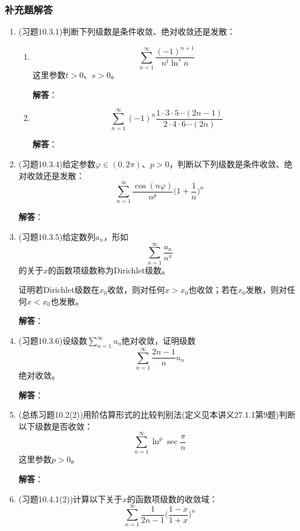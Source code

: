 \documentclass[a4paper,UTF8,fontset=windows,AutoFakeBold]{ctexart}
\newcommand*{\suminf}[1][n=1]{\sum_{#1}^\infty}
\theoremstyle{ex}
\newcommand{\sol}[1]{{\vspace{5pt}\kaishu\noindent\textbf{解答}：\vspace{-3pt}
\begin{compactitem}
    \item[] #1
\end{compactitem}
}}
\begin{document}
\subsubsection{补充题解答}
\begin{enumerate}
    \item (习题10.3.1)判断下列级数是条件收敛、绝对收敛还是发散：
    \begin{enumerate}
        \item[(9)] $$\suminf\frac{(-1)^{n+1}}{n^t\ln^sn}$$
        这里参数$t>0$、$s>0$。

        \sol{

        }

        \item[(11)] $$\suminf(-1)^n\frac{1\cdot3\cdot5\cdots(2n-1)}{2\cdot4\cdot6\cdots(2n)}$$
        
        \sol{

        }
    \end{enumerate}

    \item (习题10.3.4)给定参数$\varphi\in(0,2\pi)$、$p>0$，判断以下列级数是条件收敛、绝对收敛还是发散：
    $$\suminf\frac{\cos(n\varphi)}{n^p}\bigg(1+\frac{1}{n}\bigg)^n$$

    \sol{

    }

    \item (习题10.3.5)给定数列$a_n$，形如
    $$\suminf\frac{a_n}{n^x}$$
    的关于$x$的函数项级数称为Dirichlet级数。

    证明若Dirichlet级数在$x_0$收敛，则对任何$x>x_0$也收敛；若在$x_0$发散，则对任何$x<x_0$也发散。

    \sol{

    }

    \item (习题10.3.6)设级数$\suminf u_n$绝对收敛，证明级数
    $$\suminf\frac{2n-1}{n}u_n$$
    绝对收敛。

    \sol{

    }

    \item (总练习题10.2(2))用阶估算形式的比较判别法(定义见本讲义27.1.1第9题)判断以下级数是否收敛：
    $$\suminf\ln^p\sec\frac{\pi}{n}$$
    这里参数$p>0$。

    \sol{

    }


    \item (习题10.4.1(2))计算以下关于$x$的函数项级数的收敛域：
    $$\suminf\frac{1}{2n-1}\bigg(\frac{1-x}{1+x}\bigg)^n$$


\end{enumerate}
\end{document}
